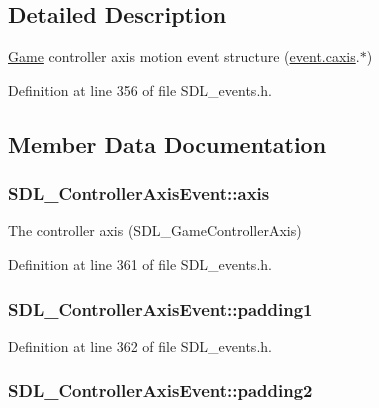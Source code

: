 \subsection{Detailed Description}
\hyperlink{class_game}{Game} controller axis motion event structure (\hyperlink{union_s_d_l___event_aa8f6df0f2716fae56204b12ab4a4c289}{event.\-caxis}.$\ast$) 

Definition at line 356 of file S\-D\-L\-\_\-events.\-h.



\subsection{Member Data Documentation}
\hypertarget{struct_s_d_l___controller_axis_event_aba6543c143521aebce06a41a8cf79db0}{
\subsubsection[{axis}]{ S\-D\-L\-\_\-\-Controller\-Axis\-Event\-::axis}}\label{struct_s_d_l___controller_axis_event_aba6543c143521aebce06a41a8cf79db0}
The controller axis (S\-D\-L\-\_\-\-Game\-Controller\-Axis) 

Definition at line 361 of file S\-D\-L\-\_\-events.\-h.

\hypertarget{struct_s_d_l___controller_axis_event_af980495b1e24f9a868f2ccb25ce9629b}{
\subsubsection[{padding1}]{ S\-D\-L\-\_\-\-Controller\-Axis\-Event\-::padding1}}\label{struct_s_d_l___controller_axis_event_af980495b1e24f9a868f2ccb25ce9629b}


Definition at line 362 of file S\-D\-L\-\_\-events.\-h.

\hypertarget{struct_s_d_l___controller_axis_event_a4a04fcd20a54db21c5258ab0e40c6ab5}{
\subsubsection[{padding2}]{ S\-D\-L\-\_\-\-Controller\-Axis\-Event\-::padding2}}\label{struct_s_d_l___controller_axis_event_a4a04fcd20a54db21c5258ab0e40c6ab5}


